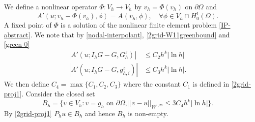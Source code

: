 \documentclass[12pt]{amsart}
\numberwithin{equation}{section}
\newcommand{\edit}[1]{{\color{blue} #1}}
\begin{document}
We define a nonlinear operator $\Phi: V_h \to V_h$ by  $ v_h = \Phi( v_h)$ on $\partial \Omega$ and
\begin{equation} \label{Phi-def}
A'(u; v_h-\Phi( v_h),\phi) = A_{}( v_h,\phi), \quad \forall \phi \in V_h \cap H_0^1(\Omega).
\end{equation}
A fixed point of $\Phi$ is a solution of the nonlinear finite element problem \eqref{IP-abstract}. We note that by \eqref{nodal-interpolant},  \eqref{2grid-W11greenbound} and \eqref{green-0}
\begin{align*}
| A'(u;I_h G - G, G^z_h) | & \leq C_2 h^k | \ln h| \\
| A'(u;I_h G - G, g^z_{h,i}) | & \leq C_3 h^k | \ln h|.
\end{align*}
We then define $C_4= \max\{ C_1, C_2, C_3 \}$ where the constant $C_1$ is defined in \eqref{2grid-proj1}.
Consider the closed set
\begin{equation}\label{2grid-ball}
B_h = \{ v \in V_h: v=g_h \text{ on } \partial \Omega, ||v-u||_{W^{1,\infty}} \leq 3 C_4 h^{k} |\ln h |\}.
\end{equation}
 By  \eqref{2grid-proj1} $P_h u \in B_h$ and hence $B_h$ is non-empty. %
\end{document}
